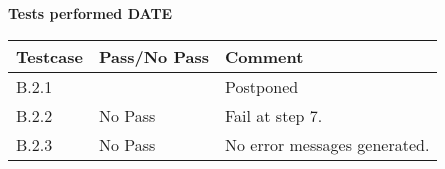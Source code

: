 \renewcommand{\testdate}{DATE}
\textbf{Tests performed \testdate}
\begin{center}
  		\begin{tabular}{| p{3cm} | p{5cm} | p{5cm} |}
    		\hline
	    	\textbf{Testcase}			& \textbf{Pass/No Pass} 	& \textbf{Comment} \\ \hline
    		B.2.1		 						& 									& Postponed 				\\ \hline
    		B.2.2		 						& No Pass 										& Fail at step 7.				 \\	\hline
    		B.2.3		 						& No Pass 										& No error messages generated.				 \\	\hline
 		\end{tabular}
\end{center}
